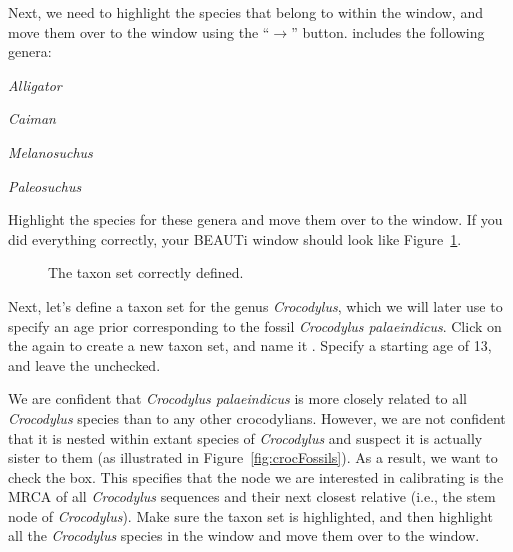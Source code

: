 {    Next, we need to highlight the species that belong to
     within the  window, and move
    them over to the  window using the ``$\to$'' button.
     includes the following genera:
    \begin{compactitem}
        \item \emph{Alligator}
        \item \emph{Caiman}
        \item \emph{Melanosuchus}
        \item \emph{Paleosuchus}
    \end{compactitem}
    Highlight the species for these genera and move them over to the
     window.
    If you did everything correctly, your BEAUTi window should look like
    Figure~\ref{fig:beautiAlligatoridae}.
    \begin{figure}[htbp]
        \centering
        \caption{The taxon set  correctly defined.}
        \label{fig:beautiAlligatoridae}
    \end{figure}

    Next, let's define a taxon set for the genus \emph{Crocodylus}, which
    we will later use to specify an age prior corresponding to the fossil
    \emph{Crocodylus palaeindicus}. Click on the \plusbutton again to
    create a new taxon set, and name it . Specify
    a starting age of 13, and leave the  unchecked.

    We are confident that \emph{Crocodylus palaeindicus} is more closely
    related to all \emph{Crocodylus} species than to any other crocodylians.
    However, we are not confident that it is nested within extant species of
    \emph{Crocodylus} and suspect it is actually sister to them (as illustrated
    in Figure~\ref{fig:crocFossils}). As a result, we want to check the
     box. This specifies that the node we are interested in
    calibrating is the MRCA of all \emph{Crocodylus} sequences and their next
    closest relative (i.e., the stem node of \emph{Crocodylus}).
    Make sure the  taxon set is highlighted, and then
    highlight all the \emph{Crocodylus} species in the 
    window and move them over to the  window.

}
